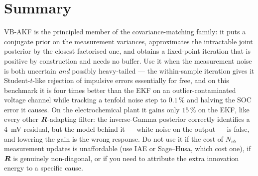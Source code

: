 \section{Summary}
VB-AKF is the principled member of the covariance-matching family: it puts a conjugate prior on the
measurement variances, approximates the intractable joint posterior by the closest factorised one,
and obtains a fixed-point iteration that is positive by construction and needs no buffer.  Use it
when the measurement noise is both uncertain \emph{and} possibly heavy-tailed --- the within-sample
iteration gives it Student-$t$-like rejection of impulsive errors essentially for free, and on this
benchmark it is four times better than the EKF on an outlier-contaminated voltage channel while
tracking a tenfold noise step to $0.1\,\%$ and halving the SOC error it causes.  On the
electrochemical plant it gains only $15\,\%$ on the EKF, like every other $\bm{R}$-adapting filter:
the inverse-Gamma posterior correctly identifies a \SI{4}{\milli\volt} residual, but the model behind
it --- white noise on the output --- is false, and lowering the gain is the wrong response.  Do not use it if the cost of $N_{vb}$ measurement
updates is unaffordable (use IAE or Sage--Husa, which cost one), if $\bm{R}$ is genuinely non-diagonal,
or if you need to attribute the extra innovation energy to a specific cause.

